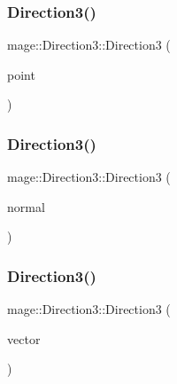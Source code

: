 \hypertarget{structmage_1_1_direction3_ad5680af7ed9856d3c5a2454bfec21b3b}{}\label{structmage_1_1_direction3_ad5680af7ed9856d3c5a2454bfec21b3b} 
\subsubsection{\texorpdfstring{Direction3()}{Direction3()}\hspace{0.1cm}{\footnotesize\ttfamily [4/6]}}
{\footnotesize\ttfamily mage\+::\+Direction3\+::\+Direction3 (\begin{DoxyParamCaption}\item[{const \hyperlink{structmage_1_1_point3}{Point3} \&}]{point }\end{DoxyParamCaption})\hspace{0.3cm}{\ttfamily [explicit]}}

\hypertarget{structmage_1_1_direction3_a18282959c79c93d25488d72f944495e3}{}\label{structmage_1_1_direction3_a18282959c79c93d25488d72f944495e3} 
\subsubsection{\texorpdfstring{Direction3()}{Direction3()}\hspace{0.1cm}{\footnotesize\ttfamily [5/6]}}
{\footnotesize\ttfamily mage\+::\+Direction3\+::\+Direction3 (\begin{DoxyParamCaption}\item[{const \hyperlink{structmage_1_1_normal3}{Normal3} \&}]{normal }\end{DoxyParamCaption})}

\hypertarget{structmage_1_1_direction3_afb66ddfb4489dd7c0bfc25c29b97df9c}{}\label{structmage_1_1_direction3_afb66ddfb4489dd7c0bfc25c29b97df9c} 
\subsubsection{\texorpdfstring{Direction3()}{Direction3()}\hspace{0.1cm}{\footnotesize\ttfamily [6/6]}}
{\footnotesize\ttfamily mage\+::\+Direction3\+::\+Direction3 (\begin{DoxyParamCaption}\item[{const X\+M\+F\+L\+O\+A\+T3 \&}]{vector }\end{DoxyParamCaption})\hspace{0.3cm}{\ttfamily [explicit]}}

